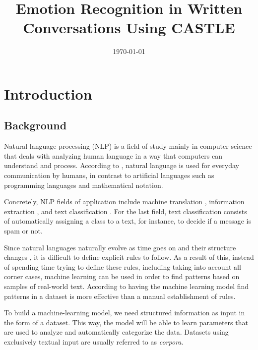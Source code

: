 \documentclass[nofilelist]{cslthse-msc}
\title{Emotion Recognition in Written Conversations Using CASTLE}
\subtitle{\protect\icon{CASTLE}}
\date{\today}
\begin{document}
\renewcommand{\bibname}{References}

\makefrontmatter
\chapter{Introduction}


\section{Background}

Natural language processing (NLP) is a field of study mainly in computer science that deals with analyzing human language in a way that computers can understand and process. According to \citet{ntlk2009}, natural language is used for everyday communication by humans, in contrast to artificial languages such as programming languages and mathematical notation. 

Concretely, NLP fields of application include machine translation \citep{machine_translation}, information extraction \citep{information_extraction}, and text classification \citep{text_classification}. For the last field, text classification consists of automatically assigning a class to a text, for instance, to decide if a message is spam or not.

Since natural languages naturally evolve as time goes on and their structure changes \citep{lyons1968introduction}, it is difficult to define explicit rules to follow. As a result of this, instead of spending time trying to define these rules, including taking into account all corner cases, machine learning can be used in order to find patterns based on samples of real-world text. According to \citet{NLP_challenges} having the machine learning model find patterns in a dataset is more effective than a manual establishment of rules.













To build a machine-learning model, we need structured information as input in the form of a dataset. This way, the model will be able to learn parameters that are used to analyze and automatically categorize the data. Datasets using exclusively textual input are usually referred to as \textit{corpora}. 
\end{document}
